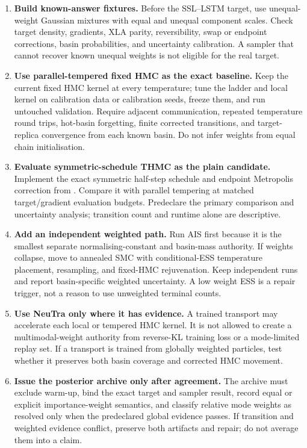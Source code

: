 \documentclass[11pt]{article}
\begin{document}
\begin{enumerate}
  \item \textbf{Build known-answer fixtures.}  Before the SSL--LSTM target, use
  unequal-weight Gaussian mixtures with equal and unequal component scales.  Check
  target density, gradients, XLA parity, reversibility, swap or endpoint corrections,
  basin probabilities, and uncertainty calibration.  A sampler that cannot recover
  known unequal weights is not eligible for the real target.

  \item \textbf{Use parallel-tempered fixed HMC as the exact baseline.}  Keep the
  current fixed HMC kernel at every temperature; tune the ladder and local kernel on
  calibration data or calibration seeds, freeze them, and run untouched validation.
  Require adjacent communication, repeated temperature round trips, hot-basin
  forgetting, finite corrected transitions, and target-replica convergence from each
  known basin.  Do not infer weights from equal chain initialisation.

  \item \textbf{Evaluate symmetric-schedule THMC as the plain candidate.}  Implement
  the exact symmetric half-step schedule and endpoint Metropolis correction from
  \citet{park2025athmc}.  Compare it with parallel tempering at matched target/gradient
  evaluation budgets.  Predeclare the primary comparison and uncertainty analysis;
  transition count and runtime alone are descriptive.

  \item \textbf{Add an independent weighted path.}  Run AIS first because it is the
  smallest separate normalising-constant and basin-mass authority.  If weights
  collapse, move to annealed SMC with conditional-ESS temperature placement,
  resampling, and fixed-HMC rejuvenation.  Keep independent runs and report
  basin-specific weighted uncertainty.  A low weight ESS is a repair trigger, not a
  reason to use unweighted terminal counts.

  \item \textbf{Use NeuTra only where it has evidence.}  A trained transport may
  accelerate each local or tempered HMC kernel.  It is not allowed to create a
  multimodal-weight authority from reverse-KL training loss or a mode-limited replay
  set.  If a transport is trained from globally weighted particles, test whether it
  preserves both basin coverage and corrected HMC movement.

  \item \textbf{Issue the posterior archive only after agreement.}  The archive must
  exclude warm-up, bind the exact target and sampler result, record equal or explicit
  importance-weight semantics, and classify relative mode weights as resolved only
  when the predeclared global evidence passes.  If transition and weighted evidence
  conflict, preserve both artifacts and repair; do not average them into a claim.


\end{enumerate}
\end{document}
